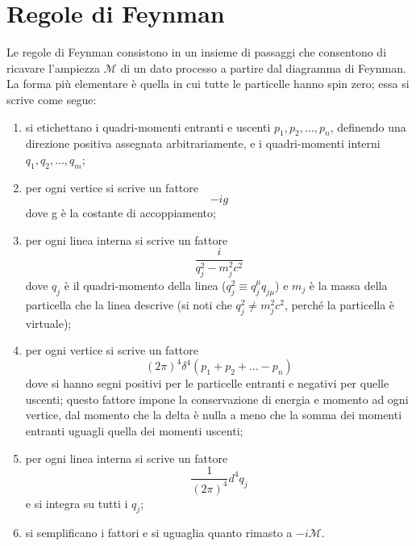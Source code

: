 \documentclass{subnucbo}
\begin{document}
\section{Regole di Feynman}
\label{app:feynman_rules}
Le regole di Feynman consistono in un insieme di passaggi che consentono di ricavare l'ampiezza $\mathcal{M}$ di un dato processo a partire dal diagramma di Feynman. La forma più elementare è quella in cui tutte le particelle hanno spin zero; essa si scrive come segue:
\begin{enumerate}
        \item si etichettano i quadri-momenti entranti e uscenti $p_{1}, p_{2}, \ldots, p_{n}$, definendo una direzione positiva assegnata arbitrariamente, e i quadri-momenti interni $q_{1}, q_{2}, \ldots, q_{m}$;
        \item per ogni vertice si scrive un fattore
                \begin{equation}
                        -ig
                \end{equation}
                dove g è la costante di accoppiamento;
        \item per ogni linea interna si scrive un fattore
                \begin{equation}
                        \frac { i } { q _ { j } ^ { 2 } - m _ { j } ^ { 2 } c ^ { 2 } }
                \end{equation}
                dove $q_{j}$ è il quadri-momento della linea ($q _ { j } ^ { 2 } \equiv q _ { j } ^ { \mu } q _ { j  \mu } $) e $m_{j}$ è la massa della particella che la linea descrive (si noti che $q _ { j } ^ { 2 } \neq m _ { j } ^ { 2 } c ^ { 2 }$, perché la particella è virtuale);
        \item per ogni vertice si scrive un fattore
                \begin{equation}
                        ( 2 \pi ) ^ { 4 } \delta ^ { 4 } \left( p _ { 1 } + p _ { 2 } + \ldots - p _ { n } \right)
                \end{equation}
                dove si hanno segni positivi per le particelle entranti e negativi per quelle uscenti; questo fattore impone la conservazione di energia e momento ad ogni vertice, dal momento che la delta è nulla a meno che la somma dei momenti entranti uguagli quella dei momenti uscenti;
        \item per ogni linea interna si scrive un fattore \begin{equation}
                        \frac { 1 } { ( 2 \pi ) ^ { 4 } } d ^ { 4 } q _ { j }
                \end{equation}
                e si integra su tutti i $q_{j}$;
        \item si semplificano i fattori e si uguaglia quanto rimasto a $-i\mathcal{M}$.
\end{enumerate}
\end{document}
